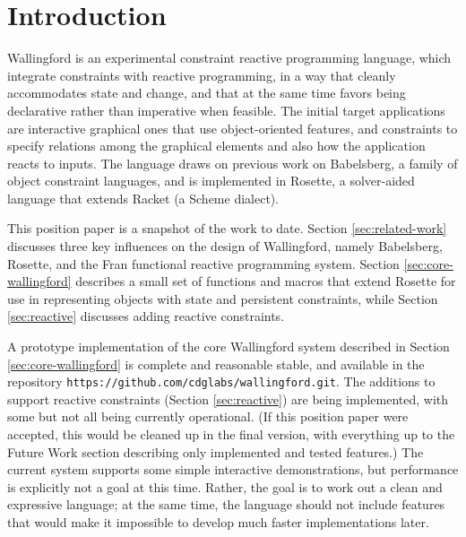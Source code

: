\documentclass{sig-alternate-05-2015}
\begin{document}

\printccsdesc



\section{Introduction}

Wallingford is an experimental constraint reactive programming
language, which integrate constraints with reactive programming, in a
way that cleanly accommodates state and change, and that at the same
time favors being declarative rather than imperative when feasible.
The initial target applications are interactive graphical ones that
use object-oriented features, and constraints to specify relations
among the graphical elements and also how the application reacts to
inputs.  The language draws on previous work on Babelsberg, a family of
object constraint languages, and is implemented in Rosette, a
solver-aided language that extends Racket (a Scheme dialect).

This position paper is a snapshot of the work to date.  Section
\ref{sec:related-work} discusses three key influences on the design of
Wallingford, namely Babelsberg, Rosette, and the Fran functional reactive
programming system.  Section \ref{sec:core-wallingford} describes a small
set of functions and macros that extend Rosette for use in representing
objects with state and persistent constraints, while Section
\ref{sec:reactive} discusses adding reactive constraints.

A prototype implementation of the core Wallingford system described in
Section \ref{sec:core-wallingford} is complete and reasonable stable, and
available in the repository
\verb|https://github.com/cdglabs/wallingford.git|.  The additions to
support reactive constraints (Section \ref{sec:reactive}) are being
implemented, with some but not all being currently operational.  (If this
position paper were accepted, this would be cleaned up in the final
version, with everything up to the Future Work section describing only
implemented and tested features.)  The current system supports some simple
interactive demonstrations, but performance is explicitly not a goal
at this time.  Rather, the goal is to work out a clean and expressive
language; at the same time, the language should not include features that
would make it impossible to develop much faster implementations later.
\end{document}

